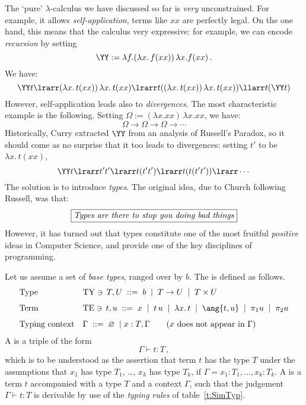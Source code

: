 \documentclass{svmult}
\begin{document}
The `pure' $\lambda$-calculus we have discussed so far is \emph{very} unconstrained. For example, it allows \emph{self-application}, \ie terms like $xx$ are perfectly legal. On the one hand, this means that the calculus very expressive: for example, we can encode \emph{recursion} by setting
\[ \YY := \lambda f.  (\lambda x. \, f(x x))\,\lambda x.  f(x x)\,. \]
We have:
\[ \YY t \lrarr (\lambda x. \, t(x x)) \,\lambda x. \, t(x x) \lrarr t ((\lambda x. \, t(x x))\,\lambda x. \, t(x x)) \llarr t(\YY t) \]
%
However, self-application leads also to \emph{divergences}. The most characteristic example is the following. Setting $\Omega :=(\lambda x.xx)\,\lambda x.xx$, we have:
\[ \Omega \longrightarrow \Omega \longrightarrow \Omega \longrightarrow \cdots \]
Historically, Curry extracted $\YY$ from an analysis of Russell's Paradox, so it should come as no surprise that it too leads to divergences:
setting $t'$ to be $\lambda x. \, t(x x)$,
\[ \YY t \lrarr t't' \lrarr t(t't')\lrarr t(t(t't')) \lrarr \cdots \]
%
The solution is to introduce \emph{types}.  The original idea, due to Church following Russell, was that:
\[ \fbox{\textit{Types are there to stop you doing bad things}} \]
However, it has turned out that types constitute one of the most fruitful \emph{positive} ideas in Computer Science, and provide  one of the
key disciplines of programming.
%
\begin{mydefinition}
Let us assume a set of \emph{base types}, ranged over by $b$. The  is defined as follows.
\begin{align*}
&\text{Type} &&
\mathrm{TY}\ni\, T,U \; ::= \; b \; \mid \; T \rightarrow U \; \mid \; T \times U %
\\[1.5mm]
&\text{Term} && \mathrm{TE}\ni\,t,u\; ::= \; x \; \mid \; {t\,u} \;\mid\; {\lambda x.\, t} \;\mid\; \ang{t,u} \;\mid\; \pi_1u \;\mid\; \pi_2u \\[1.5mm]
&\text{Typing context} && \Gamma \;::=\; \varnothing\; \mid x : T,\Gamma \qquad(x\text{ does not appear in }\Gamma)
\end{align*}
A  is a triple of the form
\[ \Gamma \vdash t : T\,, \]
which is to be understood as the assertion that term $t$ has the type $T$ under the assumptions that $x_{1}$ has type $T_{1}$, \ldots , $x_{k}$ has type $T_{k}$, if $\Gamma = x_{1}:T_{1}, \ldots , x_{k} : T_{k}$. A  is a term $t$ accompanied with a type $T$ and a context $\Gamma$, such that the judgement $\Gamma\vdash t:T$ is derivable by use of the \emph{typing rules} of table~\ref{t:SimTyp}.
\deq
\end{mydefinition}
\end{document}
